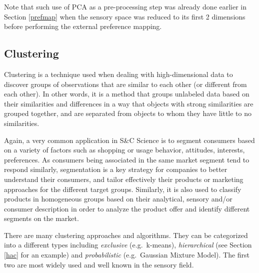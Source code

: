 \documentclass[
]{krantz}
\makeatletter
\newenvironment{Shaded}{\begin{snugshade}}{\end{snugshade}}
\newcommand{\DecValTok}[1]{\textcolor[rgb]{0.06,0.06,0.06}{#1}}
\newcommand{\FunctionTok}[1]{\textcolor[rgb]{0,0,0}{#1}}
\newcommand{\NormalTok}[1]{#1}
\newcommand{\OtherTok}[1]{\textcolor[rgb]{0.37,0.37,0.37}{#1}}
\newcommand{\SpecialCharTok}[1]{\textcolor[rgb]{0,0,0}{#1}}
\renewenvironment{quote}{\begin{VF}}{\end{VF}}
\newenvironment{kframe}{%
\medskip{}
\setlength{\fboxsep}{.8em}
 \def\at@end@of@kframe{}%
 \ifinner\ifhmode%
  \def\at@end@of@kframe{\end{minipage}}%
  \begin{minipage}{\columnwidth}%
 \fi\fi%
 \def\FrameCommand##1{\hskip\@totalleftmargin \hskip-\fboxsep
 \colorbox{shadecolor}{##1}\hskip-\fboxsep
     \hskip-\linewidth \hskip-\@totalleftmargin \hskip\columnwidth}%
 \MakeFramed {\advance\hsize-\width
   \@totalleftmargin\z@ \linewidth\hsize
   \@setminipage}}%
 {\par\unskip\endMakeFramed%
 \at@end@of@kframe}
\renewenvironment{Shaded}{\begin{kframe}}{\end{kframe}}
\makeatother
\begin{document}
\begin{Shaded}
\end{Shaded}

\begin{quote}
Note that such use of PCA as a pre-processing step was already done earlier in Section \ref{prefmap} when the sensory space was reduced to its first 2 dimensions before performing the external preference mapping.
\end{quote}

\hypertarget{clustering}{%
\subsection{Clustering}\label{clustering}}

Clustering is a technique used when dealing with high-dimensional data to discover groups of observations that are similar to each other (or different from each other). In other words, it is a method that groups unlabeled data based on their similarities and differences in a way that objects with strong similarities are grouped together, and are separated from objects to whom they have little to no similarities.

Again, a very common application in S\&C Science is to segment consumers based on a variety of factors such as shopping or usage behavior, attitudes, interests, preferences. As consumers being associated in the same market segment tend to respond similarly, segmentation is a key strategy for companies to better understand their consumers, and tailor effectively their products or marketing approaches for the different target groups. Similarly, it is also used to classify products in homogeneous groups based on their analytical, sensory and/or consumer description in order to analyze the product offer and identify different segments on the market.

There are many clustering approaches and algorithms. They can be categorized into a different types including \emph{exclusive} (e.g.~k-means), \emph{hierarchical} (see Section \ref{hac} for an example) and \emph{probabilistic} (e.g.~Gaussian Mixture Model). The first two are most widely used and well known in the sensory field.
\end{document}
